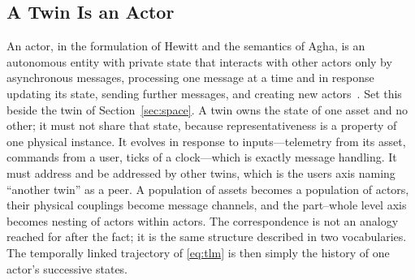 \documentclass[conference]{IEEEtran}
\begin{document}
\subsection{A Twin Is an Actor}
An actor, in the formulation of Hewitt and the semantics of Agha, is an
autonomous entity with private state that interacts with other actors only by
asynchronous messages, processing one message at a time and in response
updating its state, sending further messages, and creating new
actors~\cite{hewitt1973,agha1986}. Set this beside the twin of
Section~\ref{sec:space}. A twin owns the state of one asset and no other; it
must not share that state, because representativeness is a property of one
physical instance. It evolves in response to inputs---telemetry from its asset,
commands from a user, ticks of a clock---which is exactly message handling. It
must address and be addressed by other twins, which is the users axis naming
``another twin'' as a peer. A population of assets becomes a population of
actors, their physical couplings become message channels, and the part--whole
level axis becomes nesting of actors within actors. The correspondence is not
an analogy reached for after the fact; it is the same structure described in two
vocabularies. The temporally linked trajectory of \eqref{eq:tlm} is then simply
the history of one actor's successive states.
\end{document}
